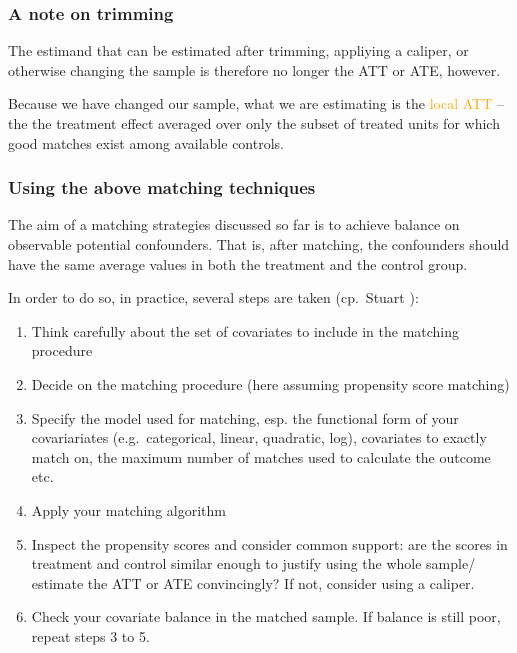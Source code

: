 \documentclass[12pt,english,dvipsnames,aspectratio=169,handout]{beamer}\usepackage[]{graphicx}\usepackage[]{xcolor}
\begin{document}
\begin{frame}
  \frametitle{A note on trimming}
\footnotesize

The estimand that can be estimated after trimming, appliying a caliper, or otherwise changing the sample is therefore no longer the ATT or ATE, however.

Because we have changed our sample, what we are estimating is the \textcolor{orange}{local ATT} -- the the treatment effect averaged over only the subset of treated units for which good matches exist among available controls. 

\vspace{3cm}

\end{frame}


\begin{frame}
  \frametitle{Using the above matching techniques}
\scriptsize

The aim of a matching strategies discussed so far is to achieve balance on observable potential confounders. That is, after matching, the confounders should have the same average values in both the treatment and the control group.

In order to do so, in practice, several steps are taken (cp.\ Stuart \citeyear{stuart_matching_2010}):
\begin{enumerate}\scriptsize
\item Think carefully about the set of covariates to include in the matching procedure
\item Decide on the matching procedure (here assuming propensity score matching)
\item Specify the model used for matching, esp. the functional form of your covariariates (e.g.\ categorical, linear, quadratic, log), covariates to exactly match on, the maximum number of matches used to calculate the outcome etc.
\item Apply your matching algorithm
\item Inspect the propensity scores and consider common support: are the scores in treatment and control similar enough to justify using the whole sample/ estimate the ATT or ATE convincingly? If not, consider using a caliper.
\item Check your covariate balance in the matched sample. If balance is still poor, repeat steps 3 to 5.
\end{enumerate}

\end{frame}
\end{document}
